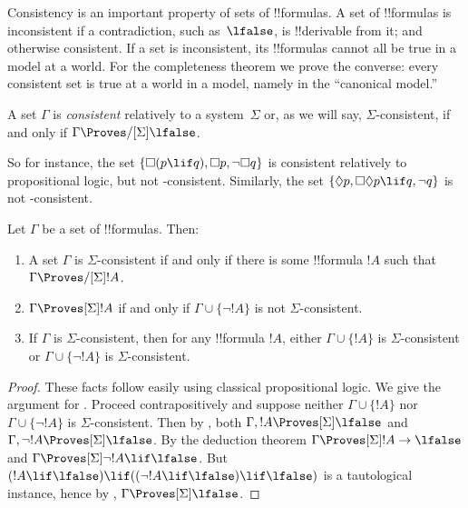\documentclass[../../../include/open-logic-section]{subfiles}
\begin{document}


Consistency is an important property of sets of !!{formula}s. A set of
!!{formula}s is inconsistent if a contradiction, such as~$\lfalse$, is
!!{derivable} from it; and otherwise consistent. If a set is
inconsistent, its !!{formula}s cannot all be true in a model at a
world. For the completeness theorem we prove the converse: every
consistent set is true at a world in a model, namely in the ``canonical
model.''

\begin{defn}
  A set $\Gamma$ is \emph{consistent} relatively to a system~$\Sigma$
  or, as we will say, $\Sigma$-consistent, if and only if $\Gamma
  \Proves/[\Sigma] \lfalse$.
\end{defn}

So for instance, the set $\{ \Box(p \lif q), \Box p, \lnot\Box q \}$ is
consistent relatively to propositional logic, but not
-consistent. Similarly, the set $\{ \Diamond p, \Box\Diamond
p \lif q, \lnot q \}$ is not -consistent.

\begin{prop}
  Let $\Gamma$ be a set of !!{formula}s. Then:
  \begin{enumerate}
  \item A set $\Gamma$ is $\Sigma$-consistent if and only if there is
    some !!{formula} $!A$ such that $\Gamma \Proves/[\Sigma]
    !A$.
  \item {}%
    $\Gamma \Proves[\Sigma] !A$ if and only if $\Gamma \cup \{
    \lnot!A \}$ is not $\Sigma$-consistent.
  \item {}%
    If $\Gamma$ is $\Sigma$-consistent, then for any !!{formula}
    $!A$, either $\Gamma \cup \{ !A \}$ is
    $\Sigma$-consistent or $\Gamma \cup \{ \lnot!A \}$ is
    $\Sigma$-consistent.
  \end{enumerate}
\end{prop}

\begin{proof}
  These facts follow easily using classical propositional logic. We
  give the argument for . Proceed
  contrapositively and suppose neither $\Gamma \cup \{ !A \}$ nor
  $\Gamma \cup \{ \lnot!A \}$ is $\Sigma$-consistent. Then by
  , both $\Gamma, !A \Proves[\Sigma]
  \lfalse$ and $\Gamma, \lnot !A \Proves[\Sigma] \lfalse$. By the
  deduction theorem $\Gamma \Proves[\Sigma] !A \to \lfalse$ and
  $\Gamma \Proves[\Sigma] \lnot!A \lif \lfalse$. But $(!A \lif
  \lfalse) \lif ((\lnot!A \lif \lfalse) \lif \lfalse)$ is a
  tautological instance, hence by
  ,
  $\Gamma \Proves[\Sigma] \lfalse$.
\end{proof}
\end{document}
